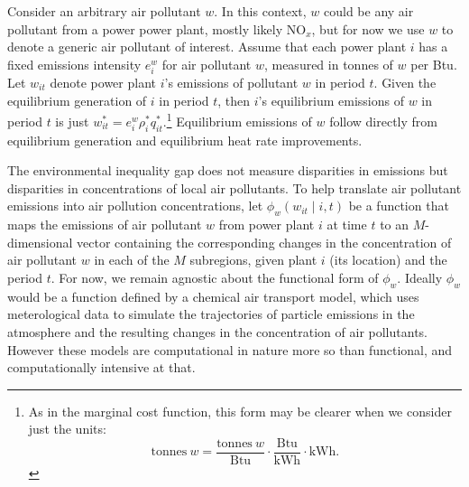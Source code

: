 Consider an arbitrary air pollutant $w$. In this context, $w$ could be any air pollutant from a power power plant, mostly likely NO$_x$, but for now we use $w$ to denote a generic air pollutant of interest. Assume that each power plant $i$ has a fixed emissions intensity $e_i^w$ for air pollutant $w$, measured in tonnes of $w$ per Btu. Let $w_{it}$ denote power plant $i$'s emissions of pollutant $w$ in period $t$. Given the equilibrium generation of $i$ in period $t$, then $i$'s equilibrium emissions of $w$ in period $t$ is just $w_{it}^* = e_i^w \rho_i^* q_{it}^*$.\footnote{As in the marginal cost function, this form may be clearer when we consider just the units: $$\text{tonnes} ~w = \frac{\text{tonnes} ~w}{\text{Btu}} \cdot \frac{\text{Btu}}{\text{kWh}} \cdot \text{kWh}.$$} Equilibrium emissions of $w$ follow directly from equilibrium generation and equilibrium heat rate improvements.

The environmental inequality gap does not measure disparities in emissions but disparities in concentrations of local air pollutants. To help translate air pollutant emissions into air pollution concentrations, let $\phi_w (w_{it}\mid i, t)$ be a function that maps the emissions of air pollutant $w$ from power plant $i$ at time $t$ to an $M$-dimensional vector containing the corresponding changes in the concentration of air pollutant $w$ in each of the $M$ subregions, given plant $i$ (its location) and the period $t$. For now, we remain agnostic about the functional form of $\phi_w$. Ideally $\phi_w$ would be a function defined by a chemical air transport model, which uses meterological data to simulate the trajectories of particle emissions in the atmosphere and the resulting changes in the concentration of air pollutants. However these models are computational in nature more so than functional, and computationally intensive at that. 

